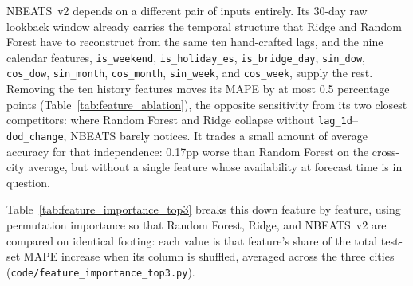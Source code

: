 ﻿\documentclass[12pt,reqno, twoside]{amsbook}
\numberwithin{figure}{chapter}
\numberwithin{table}{chapter}
\numberwithin{equation}{chapter}
\theoremstyle{plain}
\numberwithin{equation}{chapter}
\numberwithin{section}{chapter}
\begin{document}
\ac{NBEATS}~v2 depends on a different pair of inputs entirely. Its 30-day raw lookback window already carries the temporal structure that Ridge and Random Forest have to reconstruct from the same ten hand-crafted lags, and the nine calendar features, \texttt{is\_weekend}, \texttt{is\_holiday\_es}, \texttt{is\_bridge\_day}, \texttt{sin\_dow}, \texttt{cos\_dow}, \texttt{sin\_month}, \texttt{cos\_month}, \texttt{sin\_week}, and \texttt{cos\_week}, supply the rest. Removing the ten history features moves its \ac{MAPE} by at most 0.5 percentage points (Table~\ref{tab:feature_ablation}), the opposite sensitivity from its two closest competitors: where Random Forest and Ridge collapse without \texttt{lag\_1d}--\texttt{dod\_change}, \ac{NBEATS} barely notices. It trades a small amount of average accuracy for that independence: 0.17pp worse than Random Forest on the cross-city average, but without a single feature whose availability at forecast time is in question.

Table~\ref{tab:feature_importance_top3} breaks this down feature by feature, using permutation importance so that Random Forest, Ridge, and \ac{NBEATS}~v2 are compared on identical footing: each value is that feature's share of the total test-set \ac{MAPE} increase when its column is shuffled, averaged across the three cities (\texttt{code/feature\_importance\_top3.py}).
\end{document}
